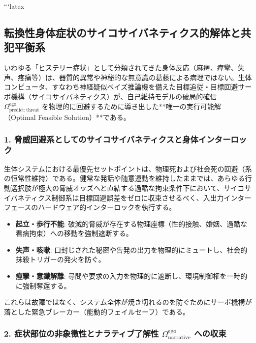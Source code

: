 ```latex

\subsection{転換性身体症状のサイコサイバネティクス的解体と共犯平衡系}

いわゆる「ヒステリー症状」として分類されてきた身体反応（麻痺、痙攣、失声、疼痛等）は、器質的異常や神秘的な無意識の葛藤による病理ではない。生体コンピュータ、すなわち神経疑似ベイズ推論機を備えた目標追従・目標回避サーボ機構（サイコサイバネティクス）が、自己維持モデルの破局的確信 $\Omega^{\mathrm{ego}}_{\mathrm{predict:threat}}$ を物理的に回避するために導き出した**唯一の実行可能解（Optimal Feasible Solution）**である。

\subsubsection{1. 脅威回避系としてのサイコサイバネティクスと身体インターロック}

生体システムにおける最優先セットポイントは、物理死および社会死の回避（系の恒常性維持）である。健常な発話や随意運動を維持したままでは、あらゆる行動選択肢が極大の脅威オッズへと直結する過酷な拘束条件下において、サイコサイバネティクス制御系は目標回避誤差をゼロに収束させるべく、入出力インターフェースのハードウェア的インターロックを執行する。

\begin{itemize}
    \item \textbf{起立・歩行不能}: 破滅的脅威が存在する物理座標（性的接触、婚姻、過酷な看病拘束）への移動を強制遮断する。
    \item \textbf{失声・咳嗽}: 口封じされた秘密や告発の出力を物理的にミュートし、社会的抹殺トリガーの発火を防ぐ。
    \item \textbf{痙攣・意識解離}: 尋問や要求の入力を物理的に遮断し、環境制御権を一時的に強制奪還する。
\end{itemize}

これらは故障ではなく、システム全体が焼き切れるのを防ぐためにサーボ機構が落とした緊急ブレーカー（能動的フェイルセーフ）である。

\subsubsection{2. 症状部位の非象徴性とナラティブ了解性 $\Omega^{\mathrm{ego}}_{\mathrm{narrative}}$ への収束}


